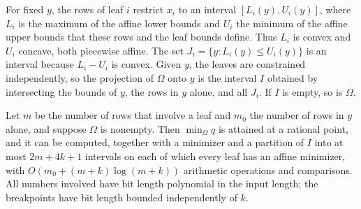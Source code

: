 For fixed $y$, the rows of leaf $i$ restrict $x_i$ to an interval
$[L_i(y),U_i(y)]$, where $L_i$ is the maximum of the affine lower bounds and
$U_i$ the minimum of the affine upper bounds that these rows and the leaf
bounds define. Thus $L_i$ is convex and $U_i$ concave, both piecewise
affine. The set $J_i=\{y:L_i(y)\le U_i(y)\}$ is an interval because $L_i-U_i$
is convex. Given $y$, the leaves are constrained independently, so the
projection of $\Omega$ onto $y$ is the interval $I$ obtained by intersecting
the bounds of $y$, the rows in $y$ alone, and all $J_i$. If $I$ is empty, so
is $\Omega$.

\begin{theorem}\label{thm:star}
Let $m$ be the number of rows that involve a leaf and $m_0$ the number of
rows in $y$ alone, and suppose $\Omega$ is nonempty. Then $\min_\Omega q$ is
attained at a rational point, and it can be computed, together with a
minimizer and a partition of $I$ into at most $2m+4k+1$ intervals on each of
which every leaf has an affine minimizer, with $O(m_0+(m+k)\log(m+k))$
arithmetic operations and comparisons. All numbers involved have bit length
polynomial in the input length; the breakpoints have bit length bounded
independently of $k$.
\end{theorem}

